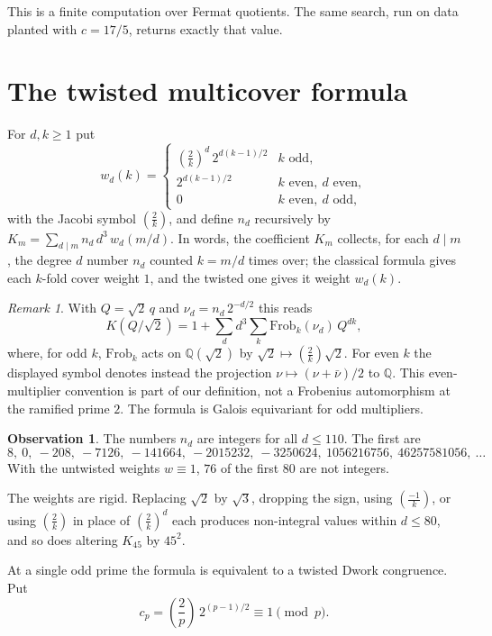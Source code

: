 \documentclass[11pt]{amsart}
\theoremstyle{definition}
\newtheorem{observation}[theorem]{Observation}
\theoremstyle{remark}
\newtheorem{remark}[theorem]{Remark}
\newcommand{\Q}{\mathbb{Q}}
\newcommand{\leg}[2]{\left(\frac{#1}{#2}\right)}
\begin{document}
This is a finite computation over Fermat quotients. The same search, run on data planted with
$c=17/5$, returns exactly that value.

\section{The twisted multicover formula}\label{sec:twist}

For $d,k\ge1$ put
\[
w_d(k)=\begin{cases}
\leg{2}{k}^d\,2^{d(k-1)/2} & k \text{ odd},\\
2^{d(k-1)/2} & k \text{ even},\ d \text{ even},\\
0 & k \text{ even},\ d \text{ odd},
\end{cases}
\]
with the Jacobi symbol $\leg2k$, and define $n_d$ recursively by
$K_m=\sum_{d\mid m}n_d\,d^3\,w_d(m/d)$. In words, the coefficient $K_m$ collects, for each $d\mid m$,
the degree $d$ number $n_d$ counted $k=m/d$ times over; the classical formula gives each $k$-fold
cover weight $1$, and the twisted one gives it weight $w_d(k)$.

\begin{remark}
With $Q=\sqrt2\,q$ and $\nu_d=n_d\,2^{-d/2}$ this reads
\[
K(Q/\sqrt2)=1+\sum_d d^3\sum_k \mathrm{Frob}_k(\nu_d)\,Q^{dk},
\]
where, for odd $k$, $\mathrm{Frob}_k$ acts on $\Q(\sqrt2)$ by $\sqrt2\mapsto\leg2k\sqrt2$. For even $k$ the displayed symbol denotes instead the projection $\nu\mapsto(\nu+\bar\nu)/2$ to $\Q$. This even-multiplier convention is part of our definition, not a Frobenius automorphism at the ramified prime $2$. The formula is Galois equivariant for odd multipliers.
\end{remark}

\begin{observation}\label{obs:integral}
The numbers $n_d$ are integers for all $d\le 110$. The first are
\[
8,\ 0,\ -208,\ -7126,\ -141664,\ -2015232,\ -3250624,\ 1056216756,\ 46257581056,\ \dots
\]
With the untwisted weights $w\equiv1$, $76$ of the first $80$ are not integers.
\end{observation}

The weights are rigid. Replacing $\sqrt2$ by $\sqrt3$, dropping the sign, using $\leg{-1}{k}$, or
using $\leg2k$ in place of $\leg2k^d$ each produces non-integral values within $d\le 80$, and so does
altering $K_{45}$ by $45^2$.

At a single odd prime the formula is equivalent to a twisted Dwork congruence. Put
\[
c_p=\leg2p\,2^{(p-1)/2}\equiv1\pmod p .
\]
\end{document}
